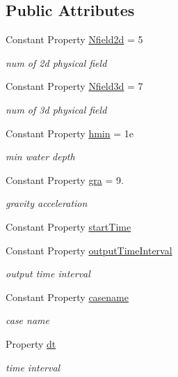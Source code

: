 \subsection*{Public Attributes}
\begin{DoxyCompactItemize}
\item 
Constant Property \hyperlink{class_l_s_w_e_abstract3d_a449d91f90631a6a64308276667668571}{Nfield2d} = 5
\begin{DoxyCompactList}\small\item\em num of 2d physical field \end{DoxyCompactList}\item 
Constant Property \hyperlink{class_l_s_w_e_abstract3d_a736563499e5b0ac0700322ce2431ec3b}{Nfield3d} = 7
\begin{DoxyCompactList}\small\item\em num of 3d physical field \end{DoxyCompactList}\item 
Constant Property \hyperlink{class_l_s_w_e_abstract3d_a41ec434090da99f3cff9dbb3a8ff5f75}{hmin} = 1e
\begin{DoxyCompactList}\small\item\em min water depth \end{DoxyCompactList}\item 
Constant Property \hyperlink{class_l_s_w_e_abstract3d_ac22168af3a2b8f7471f9cf5f8cb31074}{gra} = 9.
\begin{DoxyCompactList}\small\item\em gravity acceleration \end{DoxyCompactList}\item 
Constant Property \hyperlink{class_l_s_w_e_abstract3d_ad3eb78a02d69b23929bf7fe3ff146fc7}{start\+Time}
\item 
Constant Property \hyperlink{class_l_s_w_e_abstract3d_a0d074c18abdfb706f63fa657b6b126f7}{output\+Time\+Interval}
\begin{DoxyCompactList}\small\item\em output time interval \end{DoxyCompactList}\item 
Constant Property \hyperlink{class_l_s_w_e_abstract3d_ab05f743c824121cae94d96ddfebe4824}{casename}
\begin{DoxyCompactList}\small\item\em case name \end{DoxyCompactList}\item 
Property \hyperlink{class_l_s_w_e_abstract3d_a9945752435fa1e0f7e323d2813fd2bd3}{dt}
\begin{DoxyCompactList}\small\item\em time interval \end{DoxyCompactList}\end{DoxyCompactItemize}
